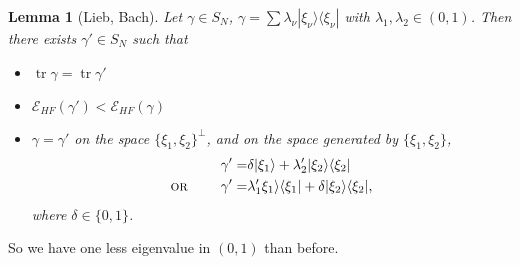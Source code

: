 \documentclass[11pt]{amsart}
\newtheorem{lem}{Lemma}
\theoremstyle{definition}
\theoremstyle{definition}
\theoremstyle{definition}
\numberwithin{equation}{section}
\begin{document}
\begin{lem}[Lieb, Bach]
Let $\gamma\in S_N$, $\gamma=\sum \lambda_\nu|\xi_\nu\rangle\langle\xi_\nu|$ with $\lambda_1,\lambda_2\in (0,1)$. Then there exists $\gamma'\in S_N$ such that
\begin{itemize}
\item $\operatorname{tr}\gamma=\operatorname{tr}\gamma'$
\item $\mathcal{E}_{HF}(\gamma')<\mathcal{E}_{HF}(\gamma)$
\item $\gamma=\gamma'$ on the space $\{\xi_1,\xi_2\}^\perp$, and on the space generated by $\{\xi_1,\xi_2\}$,
\begin{align*}
\gamma'=&\delta |\xi_1\rangle+\lambda_2'|\xi_2\rangle\langle\xi_2|\\
\text{\textsc{or} }\qquad\gamma'=&\lambda_1'\xi_1\rangle\langle\xi_1|+\delta|\xi_2\rangle\langle\xi_2|,
\end{align*}
where $\delta\in\{0,1\}$.
\end{itemize}
\end{lem}
So we have one less eigenvalue in $(0,1)$ than before.
\end{document}
